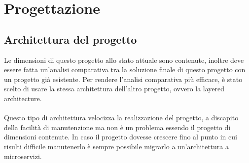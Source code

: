 
\chapter{Progettazione}
\label{cap:progettazione}

\section{Architettura del progetto}
Le dimensioni di questo progetto allo stato attuale sono contenute, inoltre deve essere fatta un'analisi
comparativa tra la soluzione finale di questo progetto con un progetto già esistente. Per rendere 
l'analisi comparativa più efficace, è stato scelto di usare la stessa architettura dell'altro progetto, 
ovvero la layered architecture.
\\\\
Questo tipo di architettura velocizza la realizzazione del progetto, a discapito della facilità di
manutenzione ma non è un problema essendo il progetto di dimensioni contenute. In caso
il progetto dovesse crescere fino al punto in cui risulti difficile manutenerlo è sempre possibile
migrarlo a un'architettura a microservizi.


